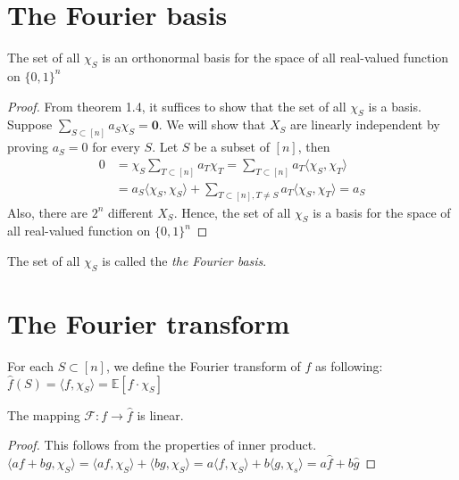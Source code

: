 \section{The Fourier basis}
\begin{theorem}
The set of all $\chi_S$ is an orthonormal basis for the space of all real-valued function on $\{ 0, 1\}^n$
\end{theorem}

\begin{proof}
From theorem 1.4, it suffices to show that the set of all $\chi_S$ is a basis. Suppose 
$\sum\limits_{S \subset [n]}a_S \chi_S = \textbf{0}$. We will show that $X_S$ are linearly independent by proving $a_S = 0$ for every $S$. Let $S$ be a subset of $[n]$, then 
\begin{align*}
0          &= \chi_S \sum\limits_{T \subset [n]} a_T \chi_T 
	       = \sum\limits_{T \subset [n]} a_T \langle \chi_S, \chi_T \rangle \\
	       &= a_S \langle \chi_S, \chi_S \rangle +
	          \sum\limits_{T \subset [n], T \neq S} a_T \langle \chi_S, \chi_T \rangle 
	       = a_S  	       	  
\end{align*}
Also, there are $2^n$ different $X_S$. Hence, the set of all $\chi_S$ is a basis for the space of all real-valued function on $\{ 0,1 \}^n$
\end{proof}
The set of all $\chi_S$ is called the \textit{the Fourier basis}.

\section{The Fourier transform}
\begin{definition} 
For each $S \subset [n]$, we define the Fourier transform of $f$ as following: 
\center
 $\hat{f}(S) = \langle f, \chi_S \rangle = \mathbb{E}[f \cdot \chi_S]$
\end{definition}

\begin{theorem}
The mapping $\mathcal{F} : f \rightarrow \hat{f}$ is linear.
\end{theorem}

\begin{proof}
This follows from the properties of inner product. \center
$\langle af + bg, \chi_S \rangle = 
 \langle af, \chi_S \rangle + \langle bg, \chi_S \rangle = 
 a\langle f, \chi_S \rangle + b \langle g, \chi_s \rangle =
 a \hat{f} + b \hat{g} $
\end{proof}

